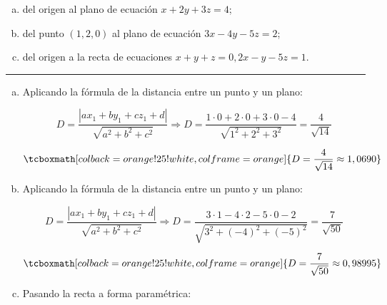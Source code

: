 \documentclass{article}
\begin{document}
\begin{enumerate}[(a)]
\bfseries
\item del origen al plano de ecuación $x + 2y +3z = 4$;

\item del punto $(1, 2, 0)$ al plano de ecuación $3x - 4y - 5z = 2$;

\item del origen a la recta de ecuaciones $x + y + z = 0, 2x - y -5z = 1$.
\end{enumerate}
\hrule

\begin{enumerate}[(a)]
\item Aplicando la fórmula de la distancia entre un punto y un plano:

\begin{equation}
D = \frac{|a x_1 + b y_1 + c z_1 + d|}{\sqrt{a^2 + b^2 + c^2}} \Rightarrow D = \frac{1 \cdot 0 + 2 \cdot 0 + 3 \cdot 0 - 4}{\sqrt{1^2 + 2^2 + 3^2}} = \frac{4}{\sqrt{14}}
\end{equation}

\begin{equation}
\tcboxmath[colback=orange!25!white,colframe=orange]
{ D = \frac{4}{\sqrt{14}} \approx 1,0690 }
\end{equation}

\item Aplicando la fórmula de la distancia entre un punto y un plano:

\begin{equation}
D = \frac{|a x_1 + b y_1 + c z_1 + d|}{\sqrt{a^2 + b^2 + c^2}} \Rightarrow D = \frac{3 \cdot 1 - 4 \cdot 2 - 5 \cdot 0 - 2}{\sqrt{3^2 + (-4)^2 + (-5)^2}} = \frac{7}{\sqrt{50}}
\end{equation}

\begin{equation}
\tcboxmath[colback=orange!25!white,colframe=orange]
{ D = \frac{7}{\sqrt{50}} \approx 0,98995 }
\end{equation}

\item Pasando la recta a forma paramétrica:


\end{enumerate}
\end{document}
